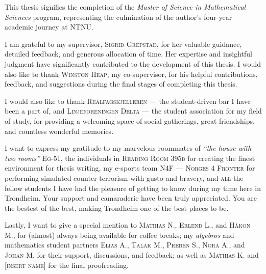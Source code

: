 




\vspace{.25in}

This thesis signifies the completion of the \textit{Master of Science in Mathematical Sciences} program, representing the culmination of the author's four-year academic journey at NTNU.

I am grateful to my supervisor, \textsc{Sigrid Grepstad}, for her valuable guidance, detailed feedback, and generous allocation of time. Her expertise and insightful judgment have significantly contributed to the development of this thesis. I would also like to thank \textsc{Winston Heap}, my co-supervisor, for his helpful contributions, feedback, and suggestions during the final stages of completing this thesis.

I would also like to thank \textsc{Realfagskjelleren} — the student-driven bar I have been a part of, and \textsc{Linjeforeningen Delta} — the student association for my field of study, for providing a welcoming space of social gatherings, great friendships, and countless wonderful memories. 

I want to express my gratitude to my marvelous roommates of \emph{\enquote{the house with two rooms}} \textsc{Eg-51}, the individuals in \textsc{Reading Room 395b} for creating the finest environment for thesis writing, my e-sports team \textsc{N4F — Norges 4 Fronter} for performing simulated counter-terrorism with gusto and bravery, and \textsc{all} the fellow students I have had the pleasure of getting to know during my time here in Trondheim. Your support and camaraderie have been truly appreciated. You are the bestest of the best, making Trondheim one of the best places to be. 

Lastly, I want to give a special mention to \textsc{Mathias N.}, \textsc{Erlend L.}, and \textsc{Håkon M.}, for (almost) always being available for coffee breaks; my \emph{algebros} and mathematics student partners \textsc{Elias A.}, \textsc{Talak M.}, \textsc{Preben S.}, \textsc{Nora A.}, and \textsc{Johan M.} for their support, discussions, and feedback; as well as \textsc{Mathias K.} and \textsc{[insert name]} for the final proofreading.



